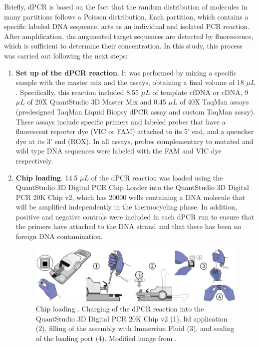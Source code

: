 Briefly, dPCR is based on the fact that the random distribution of molecules in many partitions follows a Poisson distribution. Each partition, which contains a specific labeled DNA sequence, acts as an individual and isolated PCR reaction. After amplification, the augmented target sequences are detected by fluorescence, which is sufficient to determine their concentration. In this study, this process was carried out following the next steps:
\begin{enumerate}[font=\bfseries]
    \item \textbf{Set up of the dPCR reaction}. It was performed by mixing a specific sample with the master mix and the assays, obtaining a final volume of 18 $\mu L$. Specifically, this reaction included 8.55 $\mu L$ of template cfDNA or cDNA, 9 $\mu L$ of 20X QuantStudio\texttrademark{} 3D Master Mix and 0.45 $\mu L$ of 40X TaqMan\texttrademark{} assays (predesigned TaqMan\texttrademark{} Liquid Biopsy dPCR assay and custom TaqMan\texttrademark{} assay). These assays include specific primers and labeled probes that have a fluorescent reporter dye (VIC\texttrademark{} or FAM\texttrademark{}) attached to its 5' end, and a quencher dye at its 3' end (ROX\texttrademark{}). In all assays, probes complementary to mutated and wild type DNA sequences were labeled with the FAM\texttrademark{} and VIC\texttrademark{} dye respectively.
    \item \textbf{Chip loading}. 14.5 $\mu L$ of the dPCR reaction was loaded using the QuantStudio\texttrademark{} 3D Digital PCR Chip Loader into the QuantStudio\texttrademark{} 3D Digital PCR 20K Chip v2, which has 20000 wells containing a DNA molecule that will be amplified independently in the thermocycling phase. In addition, positive and negative controls were included in each dPCR run to ensure that the primers have attached to the DNA strand and that there has been no foreign DNA contamination.
    \begin{figure}[t]
        \centering
        \includegraphics[width=\textwidth]{Images/chapter_3/chip_loading.png}
        \caption{ Chip loading \cite{dPCR_QuantStudio}. Charging of the dPCR reaction into the QuantStudio\texttrademark{} 3D Digital PCR 20K Chip v2 (1), lid application (2), filling of the assembly with Immersion Fluid (3), and sealing of the loading port (4). Modified image from \cite{dPCR_QuantStudio}.}

\end{figure}
\end{enumerate}
